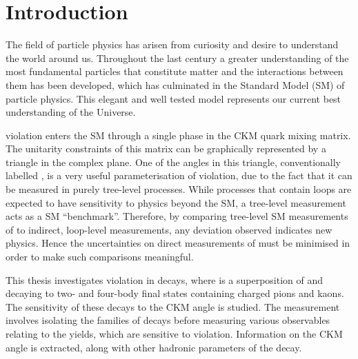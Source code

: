 %


\chapter{\label{ch:1-intro}Introduction} 

The field of particle physics has arisen from curiosity and desire to understand the world around us. Throughout the last century a greater understanding of the most fundamental particles that constitute matter and the interactions between them has been developed, which has culminated in the Standard Model (SM) of particle physics. This elegant and well tested model represents our current best understanding of the Universe.

\CP violation enters the SM through a single phase in the CKM quark mixing matrix. The unitarity constraints of this matrix can be graphically represented by a triangle in the complex plane. One of the angles in this triangle, conventionally labelled \Pgamma, is a very useful parameterisation of \CP violation, due to the fact that it can be measured in purely tree-level processes. While processes that contain loops are expected to have sensitivity to physics beyond the SM, a tree-level measurement acts as a SM ``benchmark''. Therefore, by comparing tree-level SM measurements of \Pgamma to indirect, loop-level measurements, any deviation observed indicates new physics. Hence the uncertainties on direct measurements of \Pgamma must be minimised in order to make such comparisons meaningful.

This thesis investigates \CP violation in \btodkst decays, where \D is a superposition of \Dz and \Dzb decaying to two- and four-body final states containing charged pions and kaons. The sensitivity of these decays to the CKM angle \Pgamma is studied. The measurement involves isolating the \btodkst families of decays before measuring various observables relating to the yields, which are sensitive to \CP violation. Information on the CKM angle \Pgamma is extracted, along with other hadronic parameters of the decay.

